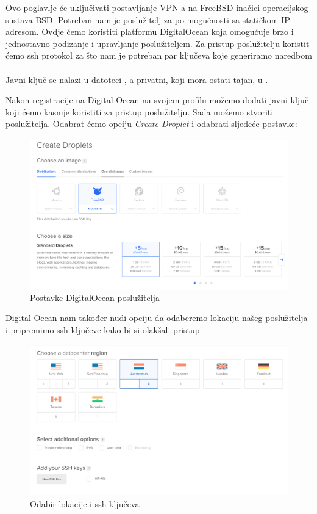 Ovo poglavlje će uključivati postavljanje VPN-a na FreeBSD inačici operacijskog
sustava BSD. 
    Potreban nam je poslužitelj za po mogućnosti sa statičkom IP adresom. Ovdje
    ćemo koristiti platformu DigitalOcean koja omogućuje brzo i jednostavno
    podizanje i upravljanje poslužiteljem. Za pristup poslužitelju koristit ćemo
    ssh protokol za što nam je potreban par ključeva koje generiramo naredbom \\

    \noindent
     \\

    \noindent
    Javni ključ se nalazi u datoteci , a privatni, koji
    mora ostati tajan, u .

    Nakon registracije na Digital Ocean na svojem profilu možemo dodati javni ključ
    koji ćemo kasnije koristiti za pristup poslužitelju. Sada možemo stvoriti
    poslužitelja. Odabrat ćemo opciju
    \textit{Create Droplet} i odabrati sljedeće postavke:

    \begin{figure}[h]
        \centering
        \includegraphics[scale=0.35]{slike/postavkeDOserver}
        \caption{Postavke DigitalOcean poslužitelja}
    \end{figure}

    \newpage
    \noindent
    Digital Ocean nam također nudi opciju da odaberemo lokaciju našeg poslužitelja
    i pripremimo ssh ključeve kako bi si olakšali pristup
    \begin{figure}[h]
        \centering
        \includegraphics[scale=0.15]{slike/lokacijaIssh}
        \caption{Odabir lokacije i ssh ključeva}
    \end{figure}

